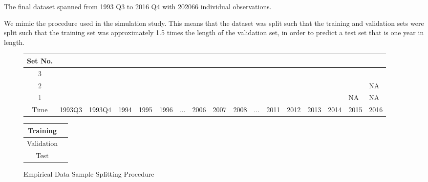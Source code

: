 \documentclass[11pt, a4paper, table]{article}
\begin{document}
The final dataset spanned from 1993 Q3 to 2016 Q4 with 202066 individual observations.

We mimic the procedure used in the simulation study. This means that the dataset was split such that the training and validation sets were split such that the training set was approximately 1.5 times the length of the validation set, in order to predict a test set that is one year in length.

\begin{figure}
	\begin{center}
		\begin{tabular}{|c|p{0.50cm}p{0.50cm}p{0.50cm}p{0.50cm}p{0.50cm}p{0.50cm}p{0.50cm}p{0.50cm}p{0.50cm}p{0.50cm}p{0.50cm}p{0.50cm}p{0.50cm}p{0.50cm}p{0.50cm}p{0.50cm}|}
			\hline
			Set No. &&&&&&&&&&&&&&&& \\
			\hline
			3 & \cellcolor{cyan} & \cellcolor{cyan} & \cellcolor{cyan} & \cellcolor{cyan} & \cellcolor{cyan} & \cellcolor{cyan} & \cellcolor{cyan} & \cellcolor{cyan} &
			\cellcolor{pink} & \cellcolor{pink} & \cellcolor{pink} & \cellcolor{pink} & \cellcolor{pink} & \cellcolor{pink} & \cellcolor{pink} & \cellcolor{olive} \\
			2 & \cellcolor{cyan} & \cellcolor{cyan} & \cellcolor{cyan} & \cellcolor{cyan} & \cellcolor{cyan} & \cellcolor{cyan} & \cellcolor{cyan} &
			\cellcolor{pink} & \cellcolor{pink} & \cellcolor{pink} & \cellcolor{pink} & \cellcolor{pink} & \cellcolor{pink} & \cellcolor{pink} & 	
			\cellcolor{olive} & NA \\
			1 & \cellcolor{cyan} & \cellcolor{cyan} & \cellcolor{cyan} & \cellcolor{cyan} & \cellcolor{cyan} & \cellcolor{cyan} &
			\cellcolor{pink} & \cellcolor{pink} & \cellcolor{pink} & \cellcolor{pink} & \cellcolor{pink} & \cellcolor{pink} & \cellcolor{pink} & \cellcolor{olive} & NA & NA \\
			\hline
			Time & 1993Q3 & 1993Q4 & 1994 & 1995 & 1996 & ... & 2006 & 2007 & 2008 & ... & 2011 & 2012 & 2013 & 2014 & 2015 & 2016 \\
			\hline
		\end{tabular}
		\medskip
		\begin{tabular}{|c|p{0.60cm}|}
			\hline
			Training & \cellcolor{cyan} \\
			\hline
			Validation & \cellcolor{pink} \\
			\hline
			Test & \cellcolor{olive} \\
			\hline
		\end{tabular}
	\end{center}
	\caption{Empirical Data Sample Splitting Procedure}
	\label{emp_sample_split_diag}
\end{figure}
\end{document}
